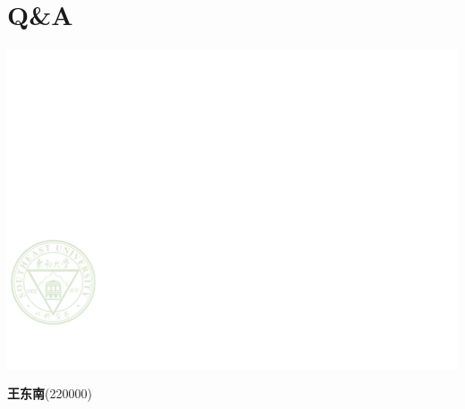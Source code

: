 \documentclass[aspectratio=169,xcolor=table,10pt]{ctexbeamer}
\begin{document}
\section*{Q\&A}
\begin{frame}
    \centering
    \vspace{2.2cm}


    \vspace{0.4cm}{\Large\itshape \faSlideshare~希望各位老师批评指正！}

    \vspace{1.3cm}
    \begin{minipage}[m]{.65\textwidth}
        \centering
       \begin{block}{}
        \begin{minipage}[m]{.15\textwidth}
            \includegraphics[width=\textwidth]{SEUlogo.pdf}
        \end{minipage}
        \begin{minipage}[m]{.67\textwidth}
     \small\centering
    \inserttitle

    \textbf{王东南}(220000)
    

\end{minipage}
\end{block}
\end{minipage}
\end{frame}
\end{document}
